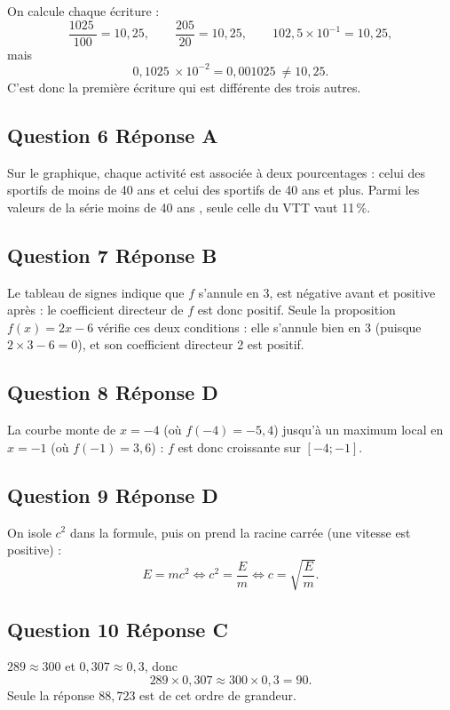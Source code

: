\documentclass[10pt]{article}
\providecommand{\np}[2][]{{#2~#1}}
\begin{document}
On calcule chaque écriture :
\[\dfrac{\np{1025}}{100} = 10,25, \qquad \dfrac{205}{20} = 10,25, \qquad 102,5 \times 10^{-1} = 10,25,\]
mais
\[\np{0,1025} \times 10^{-2} = \np{0,001025} \neq 10,25.\]
C'est donc la première écriture qui est différente des trois autres.

\subsection*{Question 6 \quad Réponse A}

Sur le graphique, chaque activité est associée à deux pourcentages : celui des sportifs de
moins de 40 ans et celui des sportifs de 40 ans et plus. Parmi les valeurs de la série \og moins de 40 ans \fg, seule celle du VTT vaut
11\,\%.

\subsection*{Question 7 \quad Réponse B}

Le tableau de signes indique que $f$ s'annule en 3, est négative avant et
positive après : le coefficient directeur de $f$ est donc positif.
Seule la proposition $f(x) = 2x - 6$ vérifie ces deux conditions : elle s'annule bien en 3
(puisque $2 \times 3 - 6 = 0$), et son coefficient directeur 2 est positif.

\subsection*{Question 8 \quad Réponse D}

La courbe monte de $x=-4$ (où $f(-4) = -5,4$) jusqu'à un maximum local en $x=-1$ (où
$f(-1) = 3,6$) : $f$ est donc croissante sur $[-4 ; -1]$.

\subsection*{Question 9 \quad Réponse D}

On isole $c^2$ dans la formule, puis on prend la racine carrée (une vitesse est positive) :
\[E = mc^2 \iff c^2 = \dfrac{E}{m} \iff c = \sqrt{\dfrac{E}{m}}.\]

\subsection*{Question 10 \quad Réponse C}

$289 \approx 300$ et $0,307 \approx 0,3$, donc
\[289 \times 0,307 \approx 300 \times 0,3 = 90.\]
Seule la réponse $88,723$ est de cet ordre de grandeur.
\end{document}
